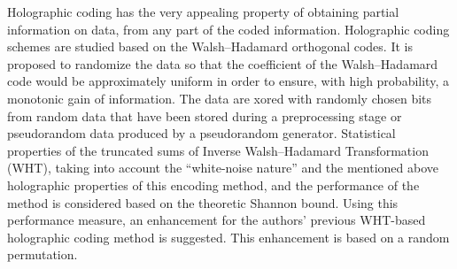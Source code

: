 \def\leftkol{ENGLISH ABSTRACTS}

\def\rightkol{ENGLISH ABSTRACTS}

\titele{\tit}{\aut}{\auf}{\leftkol}{\rightkol}


\noindent
Holographic coding has the very appealing property of obtaining partial information
on data, from any part of the
coded information. Holographic coding schemes are studied based on
the Walsh--Hadamard orthogonal codes.
It is proposed to randomize the data so that the coefficient of the
Walsh--Hadamard code would be approximately uniform in order to ensure, with
high probability, a monotonic gain of information. The data are
xored with randomly chosen bits from random data that have been
stored during a preprocessing stage or pseudorandom data produced
by a pseudorandom generator.
Statistical properties of the
truncated sums of Inverse Walsh--Hadamard Transformation (WHT),
taking into account the ``white-noise nature'' and the mentioned above  holographic properties
of this encoding method,  and the performance of the method is considered
based on the theoretic Shannon bound.
Using this performance measure, an enhancement for the authors' previous 
WHT-based holographic coding method is suggested.
This enhancement is based on a random  permutation.

 





\def\tit{MATHEMATICAL FOUNDATION, APPLICATION, AND~COMPARISON OF~GENERAL DATA 
ASSIMILATION METHOD BASED ON~DIFFUSION APPROXIMATION WITH~OTHER DATA ASSIMILATION SCHEMES}

\def\aut{K.\,P.~Belyaev$^1$, C.\,A.\,S.~Tanajura$^2$, and~N.\,P.~Tuchkova$^3$}

\def\auf{$^1$Shirshov Institute of Oceanology, Russian Academy of Sciences, 
Moscow, Russia, kb@sail.msk.ru\\[1pt]
$^2$Federal University of Bahia, Salvador, Brazil, cast@ufba.br\\[1pt]
$^3$Institution of the Russian Academy of Sciences Dorodnicyn Computing Center of RAS,
Moscow, Russia,\\
$\hphantom{^1}$tuchkova@ccas.ru}


